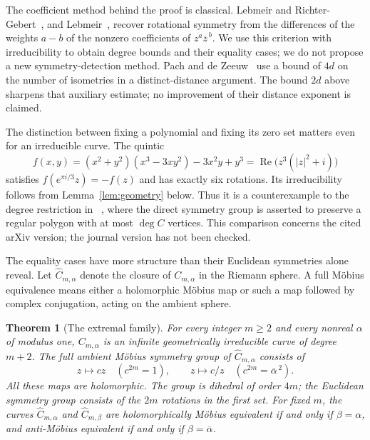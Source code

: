 \documentclass[11pt,a4paper]{article}
\newtheorem{theorem}{Theorem}
\theoremstyle{definition}
\DeclareMathOperator{\Rea}{Re}
\begin{document}
The coefficient method behind the proof is classical. Lebmeir and
Richter-Gebert~\cite[Section~4]{LRG}, and Lebmeir~\cite[Theorem~5.4]{Lebmeir},
recover rotational symmetry from the differences of the weights $a-b$
of the nonzero coefficients of $z^a\overline z^{\,b}$. We use this criterion
with irreducibility to obtain degree bounds and their equality cases;
we do not propose a new symmetry-detection method.
Pach and de Zeeuw~\cite[Lemma~2.6]{PZ} use a bound of $4d$ on the number
of isometries in a distinct-distance argument. The bound $2d$ above
sharpens that auxiliary estimate; no improvement of their distance
exponent is claimed.

The distinction between fixing a polynomial and fixing its zero set
matters even for an irreducible curve. The quintic
\begin{equation}\label{eq:quintic}
 f(x,y)=(x^2+y^2)(x^3-3xy^2)-3x^2y+y^3
       =\Rea\bigl(z^3(|z|^2+i)\bigr)
\end{equation}
satisfies $f(e^{\pi i/3}z)=-f(z)$ and has exactly six rotations.
Its irreducibility follows from Lemma~\ref{lem:geometry} below.
Thus it is a counterexample to the degree restriction in~%
\cite[Lemma~9]{ALVv1}, where the direct symmetry group is asserted to
preserve a regular polygon with at most $\deg C$ vertices. This comparison
concerns the cited arXiv version; the journal version has not been checked.

The equality cases have more structure than their Euclidean symmetries
alone reveal. Let $\widehat C_{m,\alpha}$ denote the closure of
$C_{m,\alpha}$ in the Riemann sphere. A full M\"obius equivalence means
either a holomorphic M\"obius map or such a map followed by complex
conjugation, acting on the ambient sphere.

\begin{theorem}[The extremal family]\label{thm:family}
For every integer $m\ge2$ and every nonreal $\alpha$ of modulus one,
$C_{m,\alpha}$ is an infinite geometrically irreducible curve of degree
$m+2$. The full ambient M\"obius symmetry group of $\widehat C_{m,\alpha}$ consists of
\begin{equation}\label{eq:group}
 z\longmapsto cz\quad(c^{2m}=1),\qquad
 z\longmapsto c/z\quad(c^{2m}=\overline\alpha^{\,2}).
\end{equation}
All these maps are holomorphic. The group is dihedral of order $4m$;
the Euclidean symmetry group consists of the $2m$ rotations in the first
set. For fixed $m$, the curves $\widehat C_{m,\alpha}$ and
$\widehat C_{m,\beta}$ are holomorphically M\"obius equivalent if and
only if $\beta=\alpha$, and anti-M\"obius equivalent if and only if
$\beta=\overline\alpha$.
\end{theorem}
\end{document}
